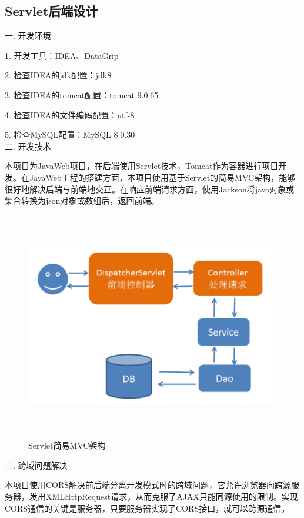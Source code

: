 \subsection{Servlet后端设计}

\noindent
一. 开发环境

1. 开发工具：IDEA、DataGrip

2. 检查IDEA的jdk配置：jdk8

3. 检查IDEA的tomcat配置：tomcat 9.0.65

4. 检查IDEA的文件编码配置：utf-8

5. 检查MySQL配置：MySQL 8.0.30~\\

\noindent
二. 开发技术

本项目为JavaWeb项目，在后端使用Servlet技术，Tomcat作为容器进行项目开发。在JavaWeb工程的搭建方面，本项目使用基于Servlet的简易MVC架构，能够很好地解决后端与前端地交互。在响应前端请求方面，使用Jackson将java对象或集合转换为json对象或数组后，返回前端。

\begin{figure}[H]
    \centering
    \includegraphics[width=15cm,height=10cm]{figures/MVC.png}
    \caption{Servlet简易MVC架构}
\end{figure}

\noindent
三. 跨域问题解决

本项目使用CORS解决前后端分离开发模式时的跨域问题，它允许浏览器向跨源服务器，发出XMLHttpRequest请求，从而克服了AJAX只能同源使用的限制。实现CORS通信的关键是服务器，只要服务器实现了CORS接口，就可以跨源通信。~\\


